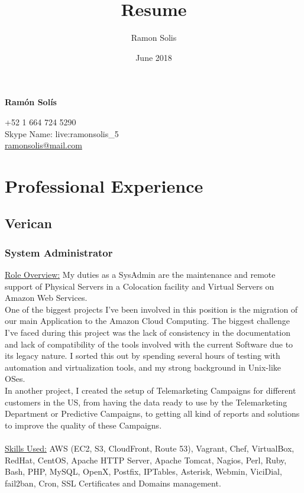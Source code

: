 \documentclass[letterpaper, 11pt]{article}
\title{Resume}
\author{Ramon Solis}
\date{June 2018}
\begin{document}
	\begin{flushright}
		{\Huge{\textbf{Ramón Solís}}}\\
		\begin{large}
		+52 1 664 724 5290\\
		Skype Name: live:ramonsolis\_5\\
		\href{mailto:ramonsolis@mail.com}{ramonsolis@mail.com}\\
		\end{large}
	\end{flushright}
	\section*{\huge{Professional Experience}}
	\noindent\makebox[\linewidth]{\rule{\textwidth}{0.5pt}} 
	\subsection*{\LARGE{\textbf{Verican}}}
	\subsubsection*{System Administrator}
	\underline{Role Overview:} 
	My duties as a SysAdmin are the maintenance and remote support of Physical Servers in a Colocation facility and Virtual Servers on Amazon Web Services.\\

One of the biggest projects I've been involved in this position is the migration of our main Application to the Amazon Cloud Computing. The biggest challenge I've faced during this project was the lack of consistency in the documentation and lack of compatibility of the tools involved with the current Software due to its legacy nature. I sorted this out by spending several hours of testing with automation and virtualization tools, and my strong background in Unix-like OSes.\\

In another project, I created the setup of Telemarketing Campaigns for different customers in the US, from having the data ready to use by the Telemarketing Department or Predictive Campaigns, to getting all kind of reports and solutions to improve the quality of these Campaigns.\\\\
	\underline{Skills Used:}
	AWS (EC2, S3, CloudFront, Route 53), Vagrant, Chef, VirtualBox, RedHat, CentOS, Apache HTTP Server, Apache Tomcat, Nagios, Perl, Ruby, Bash, PHP, MySQL, OpenX, Postfix, IPTables, Asterisk, Webmin, ViciDial, fail2ban, Cron, SSL Certificates and Domains management.
\end{document}
